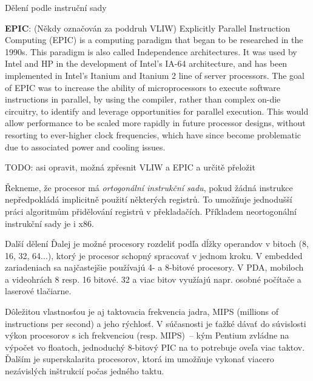 \begin{obecne}{Dělení podle instruční sady}
\begin{pitemize}
    \item \textbf{EPIC}: (Někdy označován za poddruh VLIW) Explicitly Parallel Instruction Computing (EPIC) is a computing paradigm that began to be researched in the 1990s. This paradigm is also called Independence architectures. It was used by Intel and HP in the development of Intel’s IA-64 architecture, and has been implemented in Intel’s Itanium and Itanium 2 line of server processors. The goal of EPIC was to increase the ability of microprocessors to execute software instructions in parallel, by using the compiler, rather than complex on-die circuitry, to identify and leverage opportunities for parallel execution. This would allow performance to be scaled more rapidly in future processor designs, without resorting to ever-higher clock frequencies, which have since become problematic due to associated power and cooling issues.
\end{pitemize}
\medskip
TODO: asi opravit, možná zpřesnit VLIW a EPIC a určitě přeložit

\medskip
Řekneme, že procesor má \emph{ortogonální instrukční sadu}, pokud žádná instrukce nepředpokládá implicitně použití některých registrů. To umožňuje jednodušší práci algoritmům přidělování registrů v překladačích. Příkladem neortogonální instrukční sady je i x86.
\end{obecne}

\begin{obecne}{Další dělení}
Ďalej je možné procesory rozdeliť podľa dĺžky operandov v bitoch (8, 16, 32, 64...), ktorý je procesor schopný spracovať v jednom kroku. V embedded zariadeniach sa najčastejšie používajú 4- a 8-bitové procesory. V PDA, mobiloch a videohrách 8 resp. 16 bitové. 32 a viac bitov využíajú napr. osobné počítače a laserové tlačiarne.

Dôležitou vlastnosťou je aj taktovacia frekvencia jadra, MIPS (millions of instructions per second) a jeho rýchlosť. V súčasnosti je ťažké dávať do súvislosti výkon procesorov s ich frekvenciou (resp. MIPS)~-- kým Pentium zvládne na výpočet vo floatoch, jednoduchý 8-bitový PIC na to potrebuje oveľa viac taktov. Ďalším  je superskalarita procesorov, ktorá im umožňuje vykonať viacero nezávislých inštrukcií počas jedného taktu.
\end{obecne}


